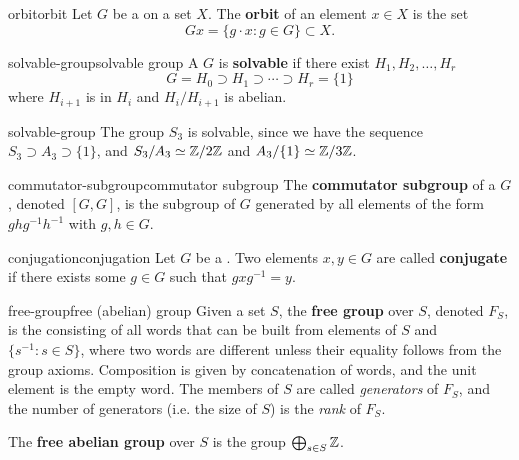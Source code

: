 \begin{topic}{orbit}{orbit}
    Let $G$ be a   on a set $X$. The \textbf{orbit} of an element $x \in X$ is the set
    \[ Gx = \{ g \cdot x : g \in G \} \subset X . \]
\end{topic}

\begin{topic}{solvable-group}{solvable group}
    A  $G$ is \textbf{solvable} if there exist  $H_1, H_2, \ldots, H_r$
    \[ G = H_0 \supset H_1 \supset \cdots \supset H_r = \{ 1 \} \]
    where $H_{i + 1}$ is  in $H_i$ and $H_i/H_{i + 1}$ is abelian.
\end{topic}

\begin{example}{solvable-group}
    The group $S_3$ is solvable, since we have the sequence $S_3 \supset A_3 \supset \{ 1 \}$, and $S_3 / A_3 \simeq \mathbb{Z}/2\mathbb{Z}$ and $A_3/\{ 1 \} \simeq \mathbb{Z}/3\mathbb{Z}$.
\end{example}

\begin{topic}{commutator-subgroup}{commutator subgroup}
    The \textbf{commutator subgroup} of a  $G$, denoted $[G, G]$, is the subgroup of $G$ generated by all elements of the form $ghg^{-1}h^{-1}$ with $g, h \in G$.
\end{topic}

\begin{topic}{conjugation}{conjugation}
    Let $G$ be a . Two elements $x, y \in G$ are called \textbf{conjugate} if there exists some $g \in G$ such that $g x g^{-1} = y$.
\end{topic}

\begin{topic}{free-group}{free (abelian) group}
    Given a set $S$, the \textbf{free group} over $S$, denoted $F_S$, is the  consisting of all words that can be built from elements of $S$ and $\{ s^{-1} : s \in S \}$, where two words are different unless their equality follows from the group axioms. Composition is given by concatenation of words, and the unit element is the empty word. The members of $S$ are called \textit{generators} of $F_S$, and the number of generators (i.e. the size of $S$) is the \textit{rank} of $F_S$.

    The \textbf{free abelian group} over $S$ is the  group $\bigoplus_{s \in S} \mathbb{Z}$.
\end{topic}


